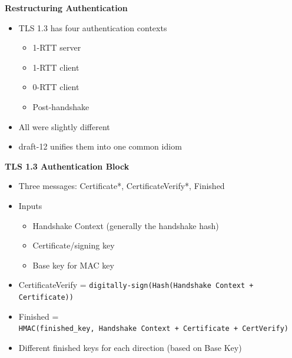 \documentclass[helvetica]{seminar}
\newcommand{\heading}[1]{%
  \begin{center} 
    \large\bf 
    #1 
  \end{center} 
  \vspace{.4 in}}
\begin{document}
\begin{slide}
\heading{Restructuring Authentication}

\begin{itemize}
\item TLS 1.3 has four authentication contexts
  \begin{itemize}
  \item 1-RTT server
  \item 1-RTT client
  \item 0-RTT client
  \item Post-handshake
  \end{itemize}

\item All were slightly different
\item draft-12 unifies them into one common idiom
\end{itemize}
\end{slide}


\begin{slide}
\heading{TLS 1.3 Authentication Block}

\begin{itemize}
\item Three messages: Certificate*, CertificateVerify*, Finished
\item Inputs
  \begin{itemize}
  \item Handshake Context (generally the handshake hash)
  \item Certificate/signing key
  \item Base key for MAC key
  \end{itemize}

\item CertificateVerify = {\small \verb^digitally-sign(Hash(Handshake Context + Certificate))^}
\item Finished = \\
  {\small \verb^HMAC(finished_key, Handshake Context + Certificate + CertVerify)^}
\item Different finished keys for each direction (based on Base Key)
\end{itemize}
\end{slide}
\end{document}
